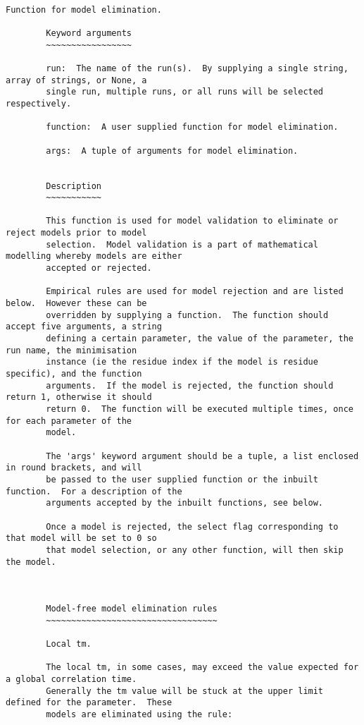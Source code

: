 \scriptsize
\begin{verbatim}

Function for model elimination.

        Keyword arguments
        ~~~~~~~~~~~~~~~~~

        run:  The name of the run(s).  By supplying a single string, array of strings, or None, a
        single run, multiple runs, or all runs will be selected respectively.

        function:  A user supplied function for model elimination.

        args:  A tuple of arguments for model elimination.


        Description
        ~~~~~~~~~~~

        This function is used for model validation to eliminate or reject models prior to model
        selection.  Model validation is a part of mathematical modelling whereby models are either
        accepted or rejected.

        Empirical rules are used for model rejection and are listed below.  However these can be
        overridden by supplying a function.  The function should accept five arguments, a string
        defining a certain parameter, the value of the parameter, the run name, the minimisation
        instance (ie the residue index if the model is residue specific), and the function
        arguments.  If the model is rejected, the function should return 1, otherwise it should
        return 0.  The function will be executed multiple times, once for each parameter of the
        model.

        The 'args' keyword argument should be a tuple, a list enclosed in round brackets, and will
        be passed to the user supplied function or the inbuilt function.  For a description of the
        arguments accepted by the inbuilt functions, see below.

        Once a model is rejected, the select flag corresponding to that model will be set to 0 so
        that model selection, or any other function, will then skip the model.
        


        Model-free model elimination rules
        ~~~~~~~~~~~~~~~~~~~~~~~~~~~~~~~~~~

        Local tm.

        The local tm, in some cases, may exceed the value expected for a global correlation time.
        Generally the tm value will be stuck at the upper limit defined for the parameter.  These
        models are eliminated using the rule:


\end{verbatim}
